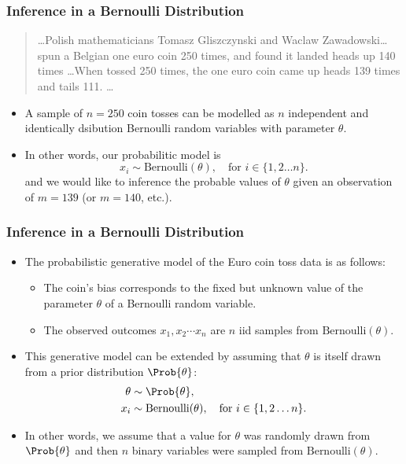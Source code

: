 \documentclass{slides}
\begin{document}
\begin{frame}
\frametitle{Inference in a Bernoulli Distribution}

\begin{quotation} \ldots Polish mathematicians Tomasz Gliszczynski and
	Waclaw Zawadowski\ldots spun a Belgian one euro coin 250 times,
	and found it landed heads up 140 times \ldots When tossed 250
	times, the one euro coin came up heads 139 times and tails 111.
	\ldots 
\end{quotation}


	\begin{itemize}
		\item A sample of $n=250$ coin tosses can be modelled as $n$ independent and identically dsibution Bernoulli random variables with parameter $\theta$.
		\item In other words, our probabilitic model is
			\[
				x_i \sim \textrm{Bernoulli}(\theta),\quad\text{for $i \in \{1,2\ldots n\}$.}
			\]
			and we would like to inference the probable values of $\theta$ given an observation of $m=139$ (or $m=140$, etc.).
	\end{itemize}
\end{frame}
\begin{frame}
	\frametitle{Inference in a Bernoulli Distribution}
	\begin{itemize}
		\item The probabilistic generative model of the Euro coin toss data is as follows:
			\begin{itemize}
				\item The coin's bias corresponds to the fixed but unknown value of the parameter $\theta$ of a Bernoulli random variable.
				\item The observed outcomes $x_1, x_2 \cdots x_n$ are $n$ iid samples from $\textrm{Bernoulli}(\theta)$.
			\end{itemize}
		\item This generative model can be extended by assuming that $\theta$ is itself drawn from a prior distribution $\Prob{\theta}$:
			\begin{align*}
				\theta &\sim \Prob{\theta},\\
				x_i &\sim \textrm{Bernoulli}(\theta),\quad\text{for $i \in \{1,2\ldots n\}$.}
			\end{align*}
		\item In other words, we assume that a value for $\theta$ was randomly drawn from $\Prob{\theta}$ and then $n$ binary variables were sampled from $\textrm{Bernoulli}(\theta)$.
	\end{itemize}
\end{frame}
\end{document}
